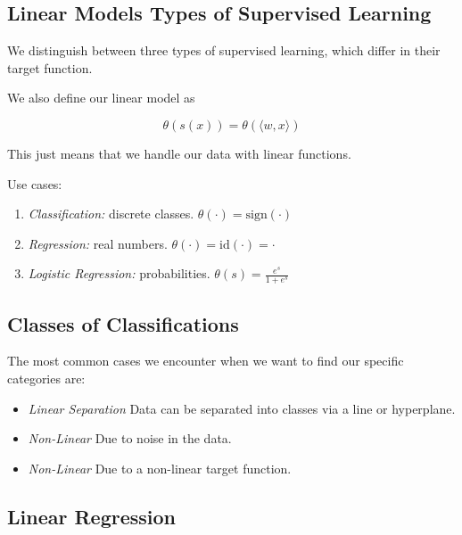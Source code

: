 \subsection{Linear Models Types of Supervised Learning}

We distinguish between three types of supervised learning, which differ in their target function.

We also define our linear model as 

\[
    \theta(s(x)) = \theta \left(\langle w, x \rangle\right)
\]

This just means that we handle our data with linear functions. 

Use cases: 

\begin{enumerate}

    \item \emph{Classification:} discrete classes. \(\theta( \cdot) = \text{sign}(\cdot)\)
    
    \item \emph{Regression:} real numbers. \(\theta( \cdot) = \text{id}(\cdot) = \cdot\)
    
    \item \emph{Logistic Regression:} probabilities. \(\theta(s) = \frac{e^s}{1 + e^s}\)

\end{enumerate}

\subsection{Classes of Classifications}

The most common cases we encounter when we want to find our specific categories are: 

\begin{itemize}
    
    \item \emph{Linear Separation} Data can be separated into classes via a line or hyperplane.

    \item \emph{Non-Linear} Due to noise in the data.

    \item \emph{Non-Linear} Due to a non-linear target function.

\end{itemize}

\subsection{Linear Regression}

